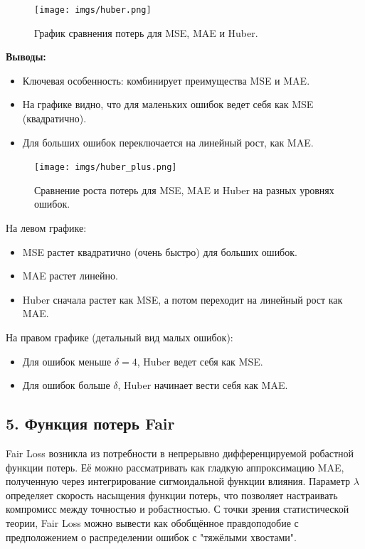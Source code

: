 \begin{figure}[h!]
    \centering
    \texttt{[image: imgs/huber.png]}
    \caption{График сравнения потерь для MSE, MAE и Huber.}
    \label{fig:huber_graph}
\end{figure}

\noindent\textbf{Выводы:}
\begin{itemize}
    \item Ключевая особенность: комбинирует преимущества MSE и MAE.
    \item На графике видно, что для маленьких ошибок ведет себя как MSE (квадратично).
    \item Для больших ошибок переключается на линейный рост, как MAE.
\end{itemize}

\begin{figure}[h!]
    \centering
    \texttt{[image: imgs/huber\_plus.png]}
    \caption{Сравнение роста потерь для MSE, MAE и Huber на разных уровнях ошибок.}
    \label{fig:huber_plus}
\end{figure}

\noindent На левом графике:
\begin{itemize}
    \item MSE растет квадратично (очень быстро) для больших ошибок.
    \item MAE растет линейно.
    \item Huber сначала растет как MSE, а потом переходит на линейный рост как MAE.
\end{itemize}

На правом графике (детальный вид малых ошибок):
\begin{itemize}
    \item Для ошибок меньше $\delta=4$, Huber ведет себя как MSE.
    \item Для ошибок больше $\delta$, Huber начинает вести себя как MAE.
\end{itemize}

\subsection*{5. Функция потерь Fair}

Fair Loss возникла из потребности в непрерывно дифференцируемой робастной функции потерь. Её можно рассматривать как гладкую аппроксимацию MAE, полученную через интегрирование сигмоидальной функции влияния. Параметр $\lambda$ определяет скорость насыщения функции потерь, что позволяет настраивать компромисс между точностью и робастностью. С точки зрения статистической теории, Fair Loss можно вывести как обобщённое правдоподобие с предположением о распределении ошибок с "тяжёлыми хвостами".

